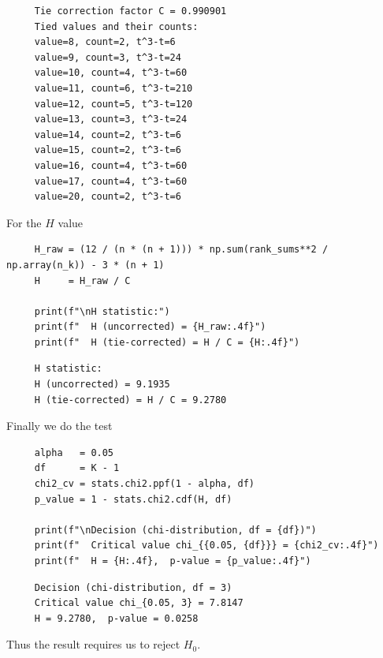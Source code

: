 \documentclass[letterpaper]{article}
\begin{document}
\begin{minipage}{\linewidth}
	\begin{Verbatim}
     Tie correction factor C = 0.990901
     Tied values and their counts:
     value=8, count=2, t^3-t=6
     value=9, count=3, t^3-t=24
     value=10, count=4, t^3-t=60
     value=11, count=6, t^3-t=210
     value=12, count=5, t^3-t=120
     value=13, count=3, t^3-t=24
     value=14, count=2, t^3-t=6
     value=15, count=2, t^3-t=6
     value=16, count=4, t^3-t=60
     value=17, count=4, t^3-t=60
     value=20, count=2, t^3-t=6
	\end{Verbatim}
\end{minipage}

For the $H$ value

\begin{lstlisting}
     H_raw = (12 / (n * (n + 1))) * np.sum(rank_sums**2 / np.array(n_k)) - 3 * (n + 1)
     H     = H_raw / C
     
     print(f"\nH statistic:")
     print(f"  H (uncorrected) = {H_raw:.4f}")
     print(f"  H (tie-corrected) = H / C = {H:.4f}")
\end{lstlisting}

\begin{minipage}{\linewidth}
	\begin{Verbatim}
     H statistic:
     H (uncorrected) = 9.1935
     H (tie-corrected) = H / C = 9.2780
	\end{Verbatim}
\end{minipage}


Finally we do the test

\begin{lstlisting}
     alpha   = 0.05
     df      = K - 1
     chi2_cv = stats.chi2.ppf(1 - alpha, df)
     p_value = 1 - stats.chi2.cdf(H, df)
     
     print(f"\nDecision (chi-distribution, df = {df})")
     print(f"  Critical value chi_{{0.05, {df}}} = {chi2_cv:.4f}")
     print(f"  H = {H:.4f},  p-value = {p_value:.4f}")
\end{lstlisting}

\begin{minipage}{\linewidth}
	\begin{Verbatim}
     Decision (chi-distribution, df = 3)
     Critical value chi_{0.05, 3} = 7.8147
     H = 9.2780,  p-value = 0.0258
	\end{Verbatim}
\end{minipage}

Thus the result requires us to reject $H_0$.
\end{document}
